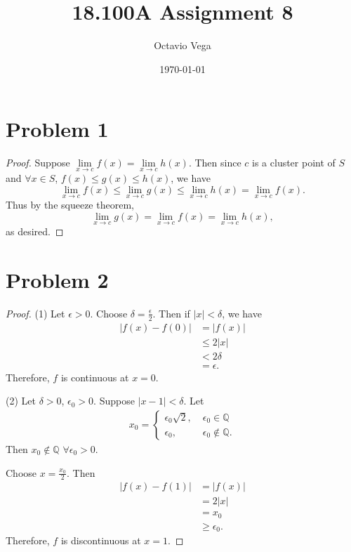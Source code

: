 \documentclass{article}
\title{18.100A Assignment 8}
\author{Octavio Vega}
\date\today
\newcommand{\Q}{\mathbb{Q}} %
\begin{document}
\maketitle

\section*{Problem 1}
\begin{proof}
	Suppose $\lim\limits_{x \to c} f(x) = \lim\limits_{x \to c} h(x)$. Then since $c$ is a cluster point of $S$ and $\forall x \in S$, $f(x) \leq g(x) \leq h(x)$, we have
	\begin{equation}
		\lim\limits_{x \to c} f(x) \leq \lim\limits_{x \to c} g(x) \leq \lim\limits_{x \to c} h(x) = \lim\limits_{x \to c} f(x).
	\end{equation}
	Thus by the squeeze theorem, 
	\begin{equation}
		\lim\limits_{x \to c} g(x) = \lim\limits_{x \to c} f(x) = \lim\limits_{x \to c} h(x),
	\end{equation}
	as desired.
\end{proof}
\section*{Problem 2}
\begin{proof}
	(1) Let $\epsilon > 0$. Choose $\delta = \frac{\epsilon}{2}$. Then if $|x| < \delta$, we have
	\begin{align}
		|f(x) - f(0)| &= |f(x)| \\
		&\leq 2 |x| \\
		& < 2 \delta \\
		&= \epsilon.
	\end{align}
	Therefore, $f$ is continuous at $x = 0$.
	
	(2) Let $\delta > 0$, $\epsilon_0 > 0$. Suppose $|x-1| < \delta$. Let
	\begin{align}
		x_0 = 
		\begin{cases}
			\epsilon_0 \sqrt{2}, \; &\epsilon_0 \in \Q \\
			\epsilon_0, \; &\epsilon_0 \notin \Q.
		\end{cases}
	\end{align}
	Then $x_0 \notin \Q$ $\forall \epsilon_0 > 0$. 
	
	Choose $x = \frac{x_0}{2}$. Then
	\begin{align}
		|f(x) - f(1)| &= |f(x)| \\
		&= 2 |x| \\
		&= x_0 \\
		&\geq \epsilon_0.
	\end{align}
	Therefore, $f$ is discontinuous at $x = 1$.
\end{proof}
\end{document}
